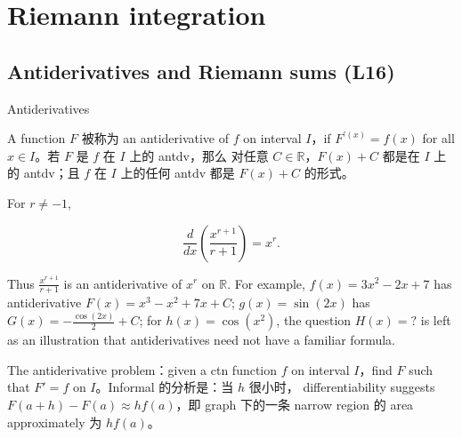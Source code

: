 \chapter{Riemann integration}

\section{Antiderivatives and Riemann sums (L16)}

\begin{definition}{Antiderivatives}

A function \(F\) 被称为 an antiderivative of \(f\) on interval \(I\)，if \(F^{'{(x)}} = f(x)\) for all \(x \in I\)。若 \(F\) 是 \(f\) 在 \(I\) 上的 antdv，那么 对任意 \(C \in \mathbb{R}\)，\(F(x) + C\) 都是在 \(I\) 上的 antdv；且 \(f\) 在 \(I\) 上的任何 antdv 都是 \(F(x) + C\) 的形式。

\end{definition}

\begin{example}

For \(r \neq - 1\),

\[\frac{d}{dx}\left( \frac{x^{r + 1}}{r + 1} \right) = x^{r}.\]

Thus \(\frac{x^{r + 1}}{r + 1}\) is an antiderivative of \(x^{r}\) on \(\mathbb{R}\). For example, \(f(x) = 3x^{2} - 2x + 7\) has antiderivative \(F(x) = x^{3} - x^{2} + 7x + C\); \(g(x) = \sin\left( {2x} \right)\) has \(G(x) = - \frac{\cos\left( {2x} \right)}{2} + C\); for \(h(x) = \cos\left( x^{2} \right)\), the question \(H(x) = ?\) is left as an illustration that antiderivatives need not have a familiar formula.

The antiderivative problem：given a ctn function \(f\) on interval \(I\)，find \(F\) such that \(F' = f\) on \(I\)。Informal 的分析是：当 \(h\) 很小时， differentiability suggests \(F\left( {a + h} \right) - F(a) \approx hf(a)\)，即 graph 下的一条 narrow region 的 area approximately 为 \(hf(a)\)。

\end{example}

